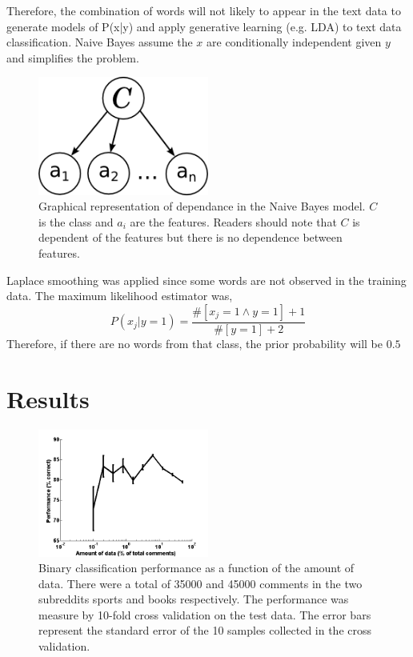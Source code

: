 \documentclass[10pt,twocolumn]{article}
\begin{document}
Therefore, the combination of words will not likely to appear in the text data to generate models of P(x|y) and apply generative learning (e.g. LDA) to text data classification.
Naive Bayes assume the $x$ are conditionally independent given $y$ and simplifies the problem.\autocite{jordan2002discriminative}

\begin{figure}
    \centering  
  	\includegraphics[width=0.5\textwidth]{./sysmag_bayes.png}
  	\caption{Graphical representation of dependance in the Naive Bayes model. $C$ is the class and $a_i$ are the features. Readers should note that $C$ is dependent of the features but there is no dependence between features. }
  	\label{bayesnet}
\end{figure}

Laplace smoothing was applied since some words are not observed in the training data. The maximum likelihood estimator was,
\[
P(x_j|y=1) = \frac {\#[x_j=1 \land y=1]+1}{\#[y=1]+2}
\]
Therefore, if there are no words from that class, the prior probability will be $0.5$
\section{Results}
\begin{figure}
    \centering
  	\includegraphics[width=0.5\textwidth]{./binary_data.png}
  \caption{ Binary classification performance as a function of the amount of data. There were a total of 35000 and 45000 comments in the two subreddits sports and books respectively. The performance was measure by 10-fold cross validation on the test data. The error bars represent the standard error of the 10 samples collected in the cross validation.}
  	\label{multiclass}
    \end{figure}
\end{document}
